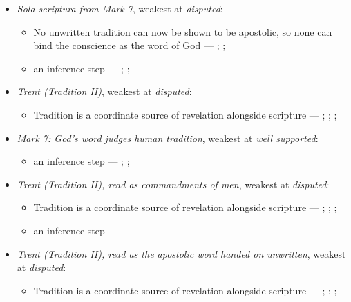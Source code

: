 \documentclass[11pt]{article}
\begin{document}
\begin{itemize}
\item \emph{Sola scriptura from Mark 7}, weakest at \emph{disputed}:
\begin{itemize}
\item No unwritten tradition can now be shown to be apostolic, so none can bind the conscience as the word of God --- \cite[503--511]{whitaker-disputation-1849}; \cite[594]{whitaker-disputation-1849}; \cite[I.6]{westminster-confession-1647}
\item an inference step --- \cite{geiselmann-meaning-of-tradition-1966}; \cite[Vatican I (1870), Pastor Aeternus, ch. 4]{tanner-decrees-1990}; \cite{florovsky-bible-church-tradition-1972}
\end{itemize}
\item \emph{Trent (Tradition II)}, weakest at \emph{disputed}:
\begin{itemize}
\item Tradition is a coordinate source of revelation alongside scripture --- \cite[Trent, Session IV (1546), Decree on Sacred Books and Traditions]{tanner-decrees-1990}; \cite{mathison-shape-sola-scriptura-2001}; \cite{geiselmann-meaning-of-tradition-1966}; \cite{congar-tradition-and-traditions-1966}
\end{itemize}
\item \emph{Mark 7: God’s word judges human tradition}, weakest at \emph{well supported}:
\begin{itemize}
\item an inference step --- \cite[Vatican II (1965), Dei Verbum 10]{tanner-decrees-1990}; \cite[IV.x.23]{calvin-institutes-1960}; \cite[15--16]{wenham-our-lords-view-1953}
\end{itemize}
\item \emph{Trent (Tradition II), read as commandments of men}, weakest at \emph{disputed}:
\begin{itemize}
\item Tradition is a coordinate source of revelation alongside scripture --- \cite[Trent, Session IV (1546), Decree on Sacred Books and Traditions]{tanner-decrees-1990}; \cite{mathison-shape-sola-scriptura-2001}; \cite{geiselmann-meaning-of-tradition-1966}; \cite{congar-tradition-and-traditions-1966}
\item an inference step --- \cite[IV.x.23]{calvin-institutes-1960}
\end{itemize}
\item \emph{Trent (Tradition II), read as the apostolic word handed on unwritten}, weakest at \emph{disputed}:
\begin{itemize}
\item Tradition is a coordinate source of revelation alongside scripture --- \cite[Trent, Session IV (1546), Decree on Sacred Books and Traditions]{tanner-decrees-1990}; \cite{mathison-shape-sola-scriptura-2001}; \cite{geiselmann-meaning-of-tradition-1966}; \cite{congar-tradition-and-traditions-1966}
\end{itemize}
\end{itemize}
\end{document}
